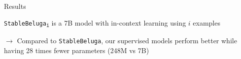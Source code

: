 \documentclass[handout,10pt]{beamer}
\begin{document}
\begin{frame}{Results}

\texttt{StableBeluga\textsubscript{i}} is a 7B model with in-context learning using $i$ examples

\begin{table}
    \centering
\caption{$F_1$-scores for character and emotion detection. Significant differences from \texttt{baseline}: ** ($p<0.01$), * ($p<0.05$).}
    \label{tab:result}
\end{table}

\vspace{0.25cm}
\pause

$\rightarrow$ Compared to \texttt{StableBeluga}, our supervised models perform better while having 28 times fewer parameters (248M vs 7B)
    
\end{frame}
\end{document}
